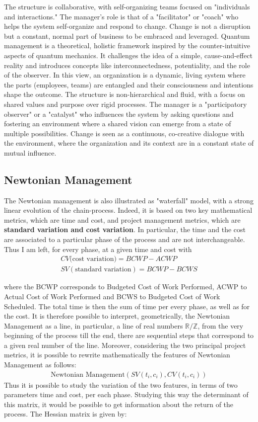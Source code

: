 \documentclass{article}
\begin{document}
The structure is collaborative, with self-organizing teams focused on "individuals and interactions." The manager's role is that of a "facilitator" or "coach" who helps the system self-organize and respond to change. Change is not a disruption but a constant, normal part of business to be embraced and leveraged. Quantum management is a theoretical, holistic framework inspired by the counter-intuitive aspects of quantum mechanics. It challenges the idea of a simple, cause-and-effect reality and introduces concepts like interconnectedness, potentiality, and the role of the observer. In this view, an organization is a dynamic, living system where the parts (employees, teams) are entangled and their consciousness and intentions shape the outcome. The structure is non-hierarchical and fluid, with a focus on shared values and purpose over rigid processes. The manager is a "participatory observer" or a "catalyst" who influences the system by asking questions and fostering an environment where a shared vision can emerge from a state of multiple possibilities. Change is seen as a continuous, co-creative dialogue with the environment, where the organization and its context are in a constant state of mutual influence.

\subsection{Newtonian Management}

The Newtonian management is also illustrated as "waterfall" model, with a strong linear evolution of the chain-process.
Indeed, it is based on two key mathematical metrics, which are time and cost, and project management metrics, which are \textbf{standard variation and cost variation}. In particular, the time and the cost are associated to a particular phase of the process and are not interchangeable. Thus I am left, for every phase, at a given time and cost with
\begin{align}
    CV (\text{cost variation)} = BCWP - ACWP\\
    SV (\text{standard variation})= BCWP - BCWS
\end{align}

where the BCWP corresponds to Budgeted Cost of Work Performed, ACWP to Actual Cost of Work Performed and BCWS to Budgeted Cost of Work Scheduled.
The total time is then the sum of time per every phase, as well as for the cost. It is therefore possible to interpret, geometrically, the Newtonian Management as a line, in particular, a line of real numbers $\mathbb{R/Z}$, from the very beginning of the process till the end, there are sequential steps that correspond to a given real number of the line. Moreover, considering the two principal project metrics, it is possible to rewrite mathematically the features of Newtonian Management as follows:
\begin{align}
    \text{Newtonian Management}(SV(t_i, c_i), CV(t_i, c_i))
\end{align}
Thus it is possible to study the variation of the two features, in terms of two parameters time and cost, per each phase. Studying this way the determinant of this matrix, it would be possible to get information about the return of the process.
The Hessian matrix is given by:
\end{document}
